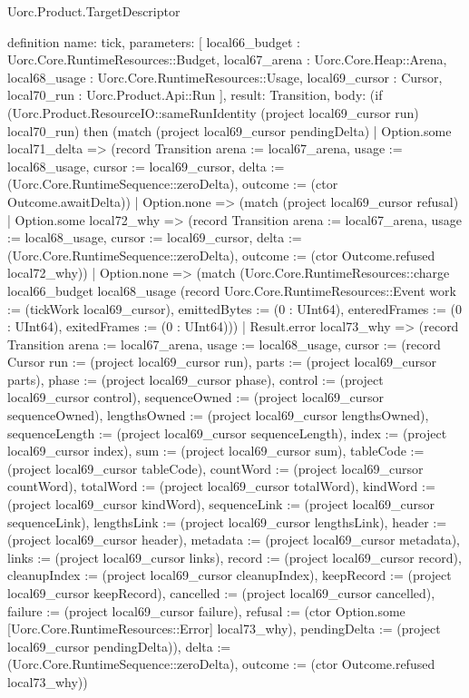 \begin{lexlean}{Uorc.Product.TargetDescriptor}
\begin{semanticmodule}
definition{
  name: tick,
  parameters: [
    local66_budget : Uorc.Core.RuntimeResources::Budget,
    local67_arena : Uorc.Core.Heap::Arena,
    local68_usage : Uorc.Core.RuntimeResources::Usage,
    local69_cursor : Cursor,
    local70_run : Uorc.Product.Api::Run
  ],
  result: Transition,
  body: (if (Uorc.Product.ResourceIO::sameRunIdentity (project local69_cursor run) local70_run) then (match (project local69_cursor pendingDelta)
    | Option.some local71_delta => (record Transition {arena := local67_arena, usage := local68_usage, cursor := local69_cursor, delta := (Uorc.Core.RuntimeSequence::zeroDelta), outcome := (ctor Outcome.awaitDelta)})
    | Option.none => (match (project local69_cursor refusal)
      | Option.some local72_why => (record Transition {arena := local67_arena, usage := local68_usage, cursor := local69_cursor, delta := (Uorc.Core.RuntimeSequence::zeroDelta), outcome := (ctor Outcome.refused local72_why)})
      | Option.none => (match (Uorc.Core.RuntimeResources::charge local66_budget local68_usage (record Uorc.Core.RuntimeResources::Event {work := (tickWork local69_cursor), emittedBytes := (0 : UInt64), enteredFrames := (0 : UInt64), exitedFrames := (0 : UInt64)}))
        | Result.error local73_why => (record Transition {arena := local67_arena, usage := local68_usage, cursor := (record Cursor {run := (project local69_cursor run), parts := (project local69_cursor parts), phase := (project local69_cursor phase), control := (project local69_cursor control), sequenceOwned := (project local69_cursor sequenceOwned), lengthsOwned := (project local69_cursor lengthsOwned), sequenceLength := (project local69_cursor sequenceLength), index := (project local69_cursor index), sum := (project local69_cursor sum), tableCode := (project local69_cursor tableCode), countWord := (project local69_cursor countWord), totalWord := (project local69_cursor totalWord), kindWord := (project local69_cursor kindWord), sequenceLink := (project local69_cursor sequenceLink), lengthsLink := (project local69_cursor lengthsLink), header := (project local69_cursor header), metadata := (project local69_cursor metadata), links := (project local69_cursor links), record := (project local69_cursor record), cleanupIndex := (project local69_cursor cleanupIndex), keepRecord := (project local69_cursor keepRecord), cancelled := (project local69_cursor cancelled), failure := (project local69_cursor failure), refusal := (ctor Option.some [Uorc.Core.RuntimeResources::Error] local73_why), pendingDelta := (project local69_cursor pendingDelta)}), delta := (Uorc.Core.RuntimeSequence::zeroDelta), outcome := (ctor Outcome.refused local73_why)})
}
\end{semanticmodule}
\end{lexlean}
